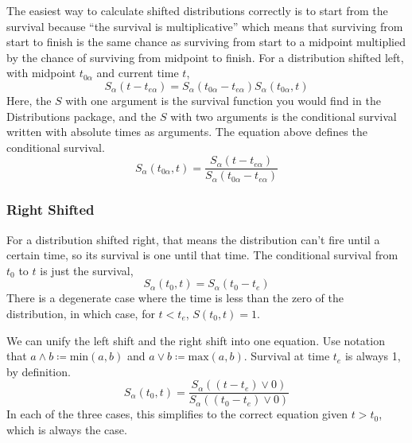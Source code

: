 \documentclass{article}
\begin{document}
The easiest way to calculate shifted distributions correctly is to start from the survival because ``the survival is multiplicative'' which means that surviving from start to finish is the same chance as surviving from start to a midpoint multiplied by the chance of surviving from midpoint to finish.
For a distribution shifted left, with midpoint $t_{0\alpha}$ and current time $t$,
\begin{equation}
	S_{\alpha}(t-t_{e\alpha}) = S_{\alpha}(t_{0\alpha} - t_{e\alpha})S_{\alpha}(t_{0\alpha}, t)
\end{equation}
Here, the $S$ with one argument is the survival function you would find in the Distributions package, and the $S$ with two arguments is the conditional survival written with absolute times as arguments. The equation above defines the conditional survival.
\begin{equation}
	S_{\alpha}(t_{0\alpha}, t) =  \frac{S_{\alpha}(t-t_{e\alpha})}{S_{\alpha}(t_{0\alpha} - t_{e\alpha})}
\end{equation}


\subsubsection{Right Shifted}

\begin{center}
\end{center}

For a distribution shifted right, that means the distribution can't fire until a certain time, so its survival is one until that time.
The conditional survival from $t_0$ to $t$ is just the survival,
\begin{equation}
  S_\alpha(t_0,t)=S_\alpha(t_0-t_e)
\end{equation}
There is a degenerate case where the time is less than the zero of the distribution, in which case, for $t<t_e$, $S(t_0,t)=1$.

We can unify the left shift and the right shift into one equation.
Use notation that $a\wedge b\coloneqq\mbox{min}(a,b)$ and $a\vee b\coloneqq\mbox{max}(a,b)$. Survival at time $t_e$ is always 1, by definition.
\begin{equation}
  S_\alpha(t_0,t)=\frac{S_\alpha((t-t_e)\vee 0)}{S_\alpha((t_0-t_e)\vee 0)}
\end{equation}
In each of the three cases, this simplifies to the correct equation given $t>t_0$, which is always the case.
\end{document}

